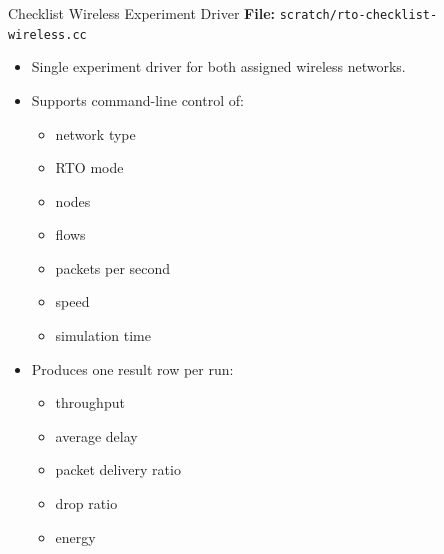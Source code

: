\documentclass[aspectratio=169]{beamer}
\begin{document}
\begin{frame}{Checklist Wireless Experiment Driver}
  \textbf{File:} \texttt{scratch/rto-checklist-wireless.cc}

  \begin{itemize}
    \item Single experiment driver for both assigned wireless networks.
    \item Supports command-line control of:
    \begin{itemize}
      \item network type
      \item RTO mode
      \item nodes
      \item flows
      \item packets per second
      \item speed
      \item simulation time
    \end{itemize}
    \item Produces one result row per run:
    \begin{itemize}
      \item throughput
      \item average delay
      \item packet delivery ratio
      \item drop ratio
      \item energy
    \end{itemize}
  \end{itemize}
\end{frame}
\end{document}

